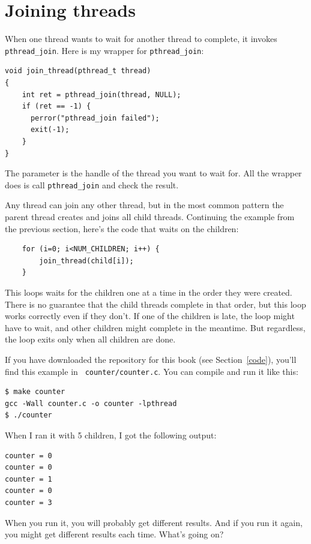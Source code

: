 \documentclass[12pt]{book}
\begin{document}
{\section{Joining threads}

When one thread wants to wait for another thread to complete,
it invokes {\tt pthread\_join}.
Here is my wrapper for {\tt pthread\_join}:

\begin{verbatim}
void join_thread(pthread_t thread)
{
    int ret = pthread_join(thread, NULL);
    if (ret == -1) {
      perror("pthread_join failed");
      exit(-1);
    }
}
\end{verbatim}

The parameter is the handle of the thread you want to wait for.
All the wrapper does is call {\tt pthread\_join} and check the
result.

Any thread can join any other thread, but in the most common pattern
the parent thread creates and joins all child threads.
Continuing the example from the previous section, here's the
code that waits on the children:

\begin{verbatim}
    for (i=0; i<NUM_CHILDREN; i++) {
        join_thread(child[i]);
    }
\end{verbatim}

This loops waits for the children one at a time in the order they
were created.  There is no guarantee that the child threads complete 
in that order, but this loop works correctly even if they don't.  If one
of the children is late, the loop might have to wait, and other children
might complete in the meantime.  But regardless, the loop exits
only when all children are done.

If you have downloaded the repository for this book (see
Section~\ref{code}), you'll find this example in {\tt
  counter/counter.c}.  You can compile and run it like this:

\begin{verbatim}
$ make counter
gcc -Wall counter.c -o counter -lpthread
$ ./counter
\end{verbatim}

When I ran it with 5 children, I got the following output:

\begin{verbatim}
counter = 0
counter = 0
counter = 1
counter = 0
counter = 3
\end{verbatim}

When you run it, you will probably get different results.  And if
you run it again, you might get different results each time.  What's
going on?


}
\end{document}
